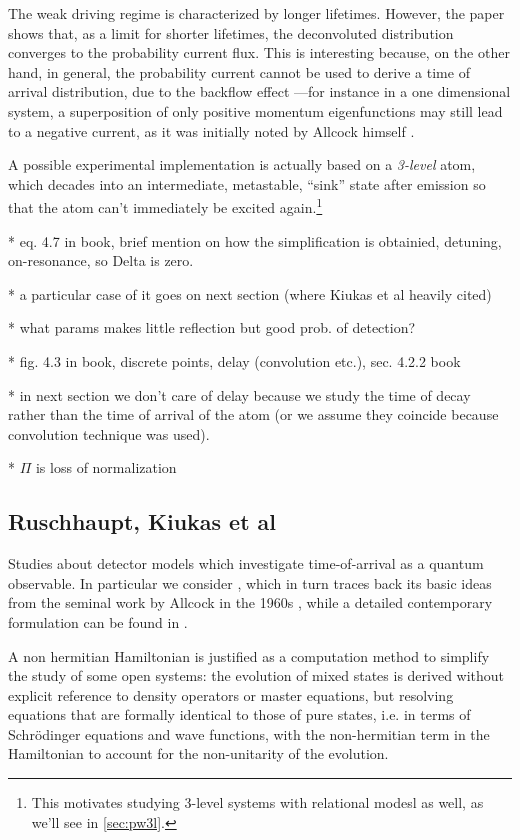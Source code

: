 The weak driving regime is characterized by longer lifetimes.
However, the paper shows that,
as a limit for shorter lifetimes,
the deconvoluted distribution converges
to
the probability current flux.
This is interesting because, on the other hand, in general,
the probability current cannot be used to derive a time of arrival
distribution, due to the backflow effect
---for instance in a one dimensional system, a superposition of only positive momentum eigenfunctions may still lead to a
negative current, as it was initially noted by Allcock himself \parencite{Allcock-3}.

A possible experimental implementation is actually based on a \emph{3-level} atom,
which decades into an intermediate, metastable, 
``sink'' state after emission \parencite{Metastable, TQM2} so 
that the atom can't immediately be excited again.\footnote{
  This motivates studying 3-level systems with
  relational modesl as well, as we'll see in \ref{sec:pw3l}.
}

* eq. 4.7 in book, brief mention on how the simplification is obtainied, detuning, on-resonance, so Delta is zero.

* a particular case of it goes on next section (where Kiukas et al heavily cited)

* what params makes little reflection but good prob. of detection?

* fig. 4.3 in book, discrete points, delay (convolution etc.), sec. 4.2.2 book

* in next section we don't care of delay because we study the time of decay rather than the time of arrival of the atom (or we assume they coincide because convolution technique was used).

* $\Pi$ is loss of normalization

\subsection{Ruschhaupt, Kiukas et al}\label{sec:hist:detect:kiukas}

Studies
about detector models which investigate
time-of-arrival as a quantum observable.
In particular we consider \cite{RuschhauptAbsorption},
which in turn traces back its basic ideas from the seminal work by Allcock
in the 1960s \parencite{Allcock-1, Allcock-2, Allcock-3},
while a detailed contemporary formulation can be found in
\cite[Ch. 4]{TQM2}.

A non hermitian Hamiltonian is justified as a computation method
to simplify the study of some open systems: the evolution of mixed
states is derived without explicit reference to density operators
or master equations, but resolving equations that are formally
identical to those of pure states,
i.e. in terms of
Schr{\"o}dinger equations and wave functions,
with the non-hermitian term in the Hamiltonian
to account for the non-unitarity of the evolution.


